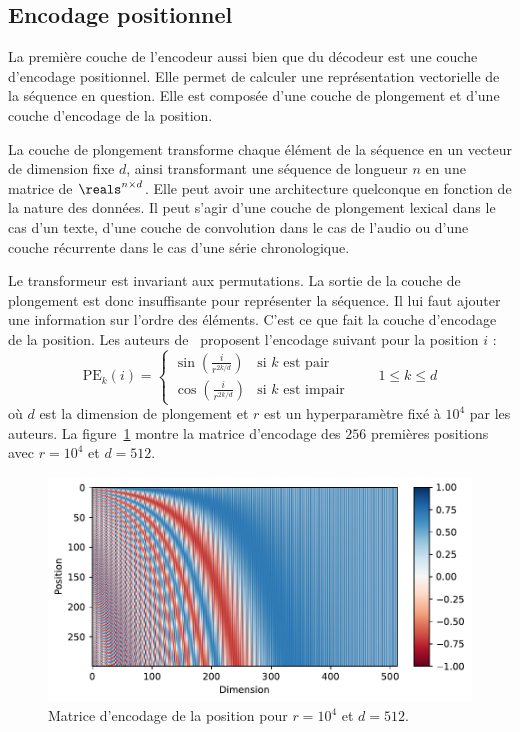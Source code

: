 \subsection{Encodage positionnel}

La première couche de l'encodeur aussi bien que du décodeur est une couche d'encodage positionnel.
Elle permet de calculer une représentation vectorielle de la séquence en question.
Elle est composée d'une couche de plongement et d'une couche d'encodage de la position.

La couche de plongement transforme chaque élément de la séquence en un vecteur de dimension fixe \(d\),
ainsi transformant une séquence de longueur \(n\) en une matrice de \(\reals^{n \times d}\).
Elle peut avoir une architecture quelconque en fonction de la nature des données.
Il peut s'agir d'une couche de plongement lexical dans le cas d'un texte, 
d'une couche de convolution dans le cas de l'audio 
ou d'une couche récurrente dans le cas d'une série chronologique.

Le transformeur est invariant aux permutations.
La sortie de la couche de plongement est donc insuffisante pour représenter la séquence.
Il lui faut ajouter une information sur l'ordre des éléments.
C'est ce que fait la couche d'encodage de la position.
Les auteurs de~\cite{attention} proposent l'encodage suivant pour la position \(i\) :
\begin{equation}
    \label{eq.sine-positional-encoding}
    \mathrm{PE}_{k}(i) = 
    \begin{cases}
        \sin\left(\frac{i}{r^{2k/d}}\right) & \text{si } k \text{ est pair} \\
        \cos\left(\frac{i}{r^{2k/d}}\right) & \text{si } k \text{ est impair}
    \end{cases} \qquad 1 \le k \le d
\end{equation}
où \(d\) est la dimension de plongement et \(r\) est un hyperparamètre fixé à \(10^4\) par les auteurs.
La figure~\ref{fig.positional-encoding} montre la matrice d'encodage des \(256\) premières positions
avec \(r=10^4\) et \(d=512\).

\begin{figure}[htb]
    \centering
    \includegraphics[width=12cm]{assets/python/positional_embedding.pdf}
    \caption{Matrice d'encodage de la position pour \(r=10^4\) et \(d=512\).}
    \label{fig.positional-encoding}
\end{figure}

